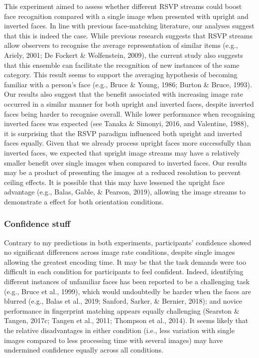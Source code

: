 \documentclass[
  english,
  man]{apa6}
\begin{document}
This experiment aimed to assess whether different RSVP streams could boost face recognition compared with a single image when presented with upright and inverted faces. In line with previous face-matching literature, our analyses suggest that this is indeed the case. While previous research suggests that RSVP streams allow observers to recognise the average representation of similar items (e.g., Ariely, 2001; De Fockert \& Wolfenstein, 2009), the current study also suggests that this ensemble can facilitate the recognition of new instances of the same category. This result seems to support the averaging hypothesis of becoming familiar with a person's face (e.g., Bruce \& Young, 1986; Burton \& Bruce, 1993). Our results also suggest that the benefit associated with increasing image rate occurred in a similar manner for both upright and inverted faces, despite inverted faces being harder to recognise overall. While lower performance when recognising inverted faces was expected (see Tanaka \& Simonyi, 2016, and Valentine, 1988), it is surprising that the RSVP paradigm influenced both upright and inverted faces equally. Given that we already process upright faces more successfully than inverted faces, we expected that upright image streams may have a relatively smaller benefit over single images when compared to inverted faces. Our results may be a product of presenting the images at a reduced resolution to prevent ceiling effects. It is possible that this may have lessened the upright face advantage (e.g., Balas, Gable, \& Pearson, 2019), allowing the image streams to demonstrate a effect for both orientation conditions.

\hypertarget{confidence-stuff}{%
\subsubsection{Confidence stuff}\label{confidence-stuff}}

Contrary to my predictions in both experiments, participants' confidence showed no significant differences across image rate conditions, despite single images allowing the greatest encoding time. It may be that the task demands were too difficult in each condition for participants to feel confident. Indeed, identifying different instances of unfamiliar faces has been reported to be a challenging task (e.g., Bruce et al., 1999), which would undoubtedly be harder when the faces are blurred (e.g., Balas et al., 2019; Sanford, Sarker, \& Bernier, 2018); and novice performance in fingerprint matching appears equally challenging (Searston \& Tangen, 2017c; Tangen et al., 2011; Thompson et al., 2014). It seems likely that the relative disadvantages in either condition (i.e., less variation with single images compared to less processing time with several images) may have undermined confidence equally across all conditions.
\end{document}
